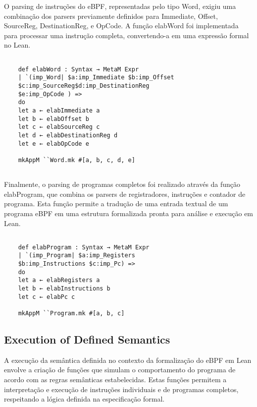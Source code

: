 \documentclass[sigconf]{acmart}
\begin{document}
O parsing de instruções do eBPF, representadas pelo tipo Word, exigiu uma combinação dos parsers previamente definidos para Immediate, Offset, SourceReg, DestinationReg, e OpCode. A função elabWord foi implementada para processar uma instrução completa, convertendo-a em uma expressão formal no Lean.
\begin{center}
\begin{verbatim}
        
    def elabWord : Syntax → MetaM Expr
    | `(imp_Word| $a:imp_Immediate $b:imp_Offset
    $c:imp_SourceReg$d:imp_DestinationReg 
    $e:imp_OpCode ) => 
    do
    let a ← elabImmediate a
    let b ← elabOffset b
    let c ← elabSourceReg c
    let d ← elabDestinationReg d
    let e ← elabOpCode e
    
    mkAppM ``Word.mk #[a, b, c, d, e]
  
\end{verbatim}
\end{center}

Finalmente, o parsing de programas completos foi realizado através da função elabProgram, que combina os parsers de registradores, instruções e contador de programa. Esta função permite a tradução de uma entrada textual de um programa eBPF em uma estrutura formalizada pronta para análise e execução em Lean.

\begin{center}
\begin{verbatim}
    
    def elabProgram : Syntax → MetaM Expr
    | `(imp_Program| $a:imp_Registers 
    $b:imp_Instructions $c:imp_Pc) => 
    do
    let a ← elabRegisters a
    let b ← elabInstructions b 
    let c ← elabPc c
    
    mkAppM ``Program.mk #[a, b, c]

\end{verbatim}
\end{center}

\subsection{Execution of Defined Semantics}

A execução da semântica definida no contexto da formalização do eBPF em Lean envolve a criação de funções que simulam o comportamento do programa de acordo com as regras semânticas estabelecidas. Estas funções permitem a interpretação e execução de instruções individuais e de programas completos, respeitando a lógica definida na especificação formal.
\end{document}
